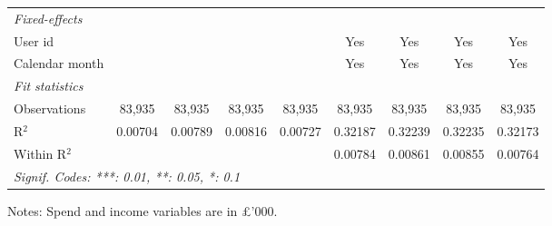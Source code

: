 \begin{table}[htbp]
\begin{threeparttable}[b]
\begin{tabular}{lcccccccc}
         \midrule
         \emph{Fixed-effects}\\
         User id                &                   &                    &                    &                   & Yes                 & Yes                 & Yes                 & Yes\\  
         Calendar month         &                   &                    &                    &                   & Yes                 & Yes                 & Yes                 & Yes\\  
         \midrule
         \emph{Fit statistics}\\
         Observations           & 83,935            & 83,935             & 83,935             & 83,935            & 83,935              & 83,935              & 83,935              & 83,935\\  
         R$^2$                  & 0.00704           & 0.00789            & 0.00816            & 0.00727           & 0.32187             & 0.32239             & 0.32235             & 0.32173\\  
         Within R$^2$           &                   &                    &                    &                   & 0.00784             & 0.00861             & 0.00855             & 0.00764\\  
         \midrule \midrule
         \multicolumn{9}{l}{\emph{Signif. Codes: ***: 0.01, **: 0.05, *: 0.1}}\\
      \end{tabular}
      
      \begin{tablenotes}\footnotesize
         \item Notes: Spend and income variables are in \pounds'000.
      \end{tablenotes}
   \end{threeparttable}
\end{table}


